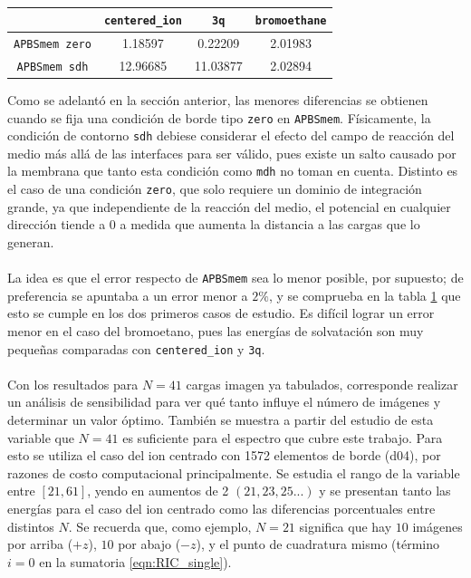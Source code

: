 \documentclass[12pt, oneside, numbers, spanish]{ezthesis}
\numberwithin{equation}{section}
\begin{document}
\begin{table}[H]
	\centering
	\caption{}
	\def\arraystretch{0.8}
	\begin{tabular}{|c|ccc|}\hline
		& \texttt{centered\_ion} & \texttt{3q} & \texttt{bromoethane} \\ \hline
		\texttt{APBSmem zero} & 1.18597 & 0.22209 & 2.01983 \\ \hline
		\texttt{APBSmem sdh} & 12.96685 & 11.03877 & 2.02894 \\ \hline
	\end{tabular}\label{table:Percent_Error}
\end{table}

\noindent
Como se adelantó en la sección anterior, las menores diferencias se obtienen cuando se fija una condición de borde tipo \texttt{zero} en \texttt{APBSmem}. Físicamente, la condición de contorno \texttt{sdh} debiese considerar el efecto del campo de reacción del medio más allá de las interfaces para ser válido, pues existe un salto causado por la membrana que tanto esta condición como \texttt{mdh} no toman en cuenta. Distinto es el caso de una condición \texttt{zero}, que solo requiere un dominio de integración grande, ya que independiente de la reacción del medio, el potencial en cualquier dirección tiende a $0$ a medida que aumenta la distancia a las cargas que lo generan.\\\\
La idea es que el error respecto de \texttt{APBSmem} sea lo menor posible, por supuesto; de preferencia se apuntaba a un error menor a $2\%$, y se comprueba en la tabla \ref{table:Percent_Error} que esto se cumple en los dos primeros casos de estudio. Es difícil lograr un error menor en el caso del bromoetano, pues las energías de solvatación son muy pequeñas comparadas con \texttt{centered\_ion} y \texttt{3q}.\\\\
Con los resultados para $N=41$ cargas imagen ya tabulados, corresponde realizar un análisis de sensibilidad para ver qué tanto influye el número de imágenes y determinar un valor óptimo. También se muestra a partir del estudio de esta variable que $N=41$ es suficiente para el espectro que cubre este trabajo. Para esto se utiliza el caso del ion centrado con 1572 elementos de borde (d04), por razones de costo computacional principalmente. Se estudia el rango de la variable entre $[21,61]$, yendo en aumentos de 2 $(21, 23, 25...)$ y se presentan tanto las energías para el caso del ion centrado como las diferencias porcentuales entre distintos $N$. Se recuerda que, como ejemplo, $N=21$ significa que hay $10$ imágenes por arriba ($+z$), $10$ por abajo ($-z$), y el punto de cuadratura mismo (término $i = 0$ en la sumatoria \ref{eqn:RIC_single}).\\\\
\end{document}
